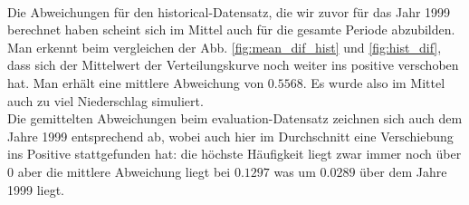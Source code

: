 \hfill\\
Die Abweichungen für den historical-Datensatz, die wir zuvor für das Jahr 1999 berechnet haben scheint sich im Mittel auch für die gesamte Periode abzubilden. Man erkennt beim vergleichen der Abb. \ref{fig:mean_dif_hist} und \ref{fig:hist_dif}, dass sich der Mittelwert der Verteilungskurve noch weiter ins positive verschoben hat. Man erhält eine mittlere Abweichung von $0.5568$. Es wurde also im Mittel auch zu viel Niederschlag simuliert.\\
Die gemittelten Abweichungen beim evaluation-Datensatz zeichnen sich auch dem Jahre 1999 entsprechend ab, wobei auch hier im Durchschnitt eine Verschiebung ins Positive stattgefunden hat: die höchste Häufigkeit liegt zwar immer noch über $0$ aber die mittlere Abweichung liegt bei $0.1297$ was um $0.0289	$ über dem Jahre 1999 liegt.